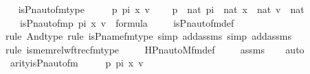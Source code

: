 \begin{isabellebody}
\ \isanewline
\isanewline
{}\isamarkupfalse%
\ is{\isacharunderscore}{\kern0pt}Pn{\isacharunderscore}{\kern0pt}auto{\isacharunderscore}{\kern0pt}fm{\isacharunderscore}{\kern0pt}type\ {\isacharcolon}{\kern0pt}\ \isanewline
\ \ \ p\ pi\ x\ v\ \isanewline
\ \ \ {\isachardoublequoteopen}p\ {\isasymin}\ nat{\isachardoublequoteclose}\ {\isachardoublequoteopen}pi\ {\isasymin}\ nat{\isachardoublequoteclose}\ {\isachardoublequoteopen}x\ {\isasymin}\ nat{\isachardoublequoteclose}\ {\isachardoublequoteopen}v\ {\isasymin}\ nat{\isachardoublequoteclose}\ \isanewline
\ \ \ {\isachardoublequoteopen}is{\isacharunderscore}{\kern0pt}Pn{\isacharunderscore}{\kern0pt}auto{\isacharunderscore}{\kern0pt}fm{\isacharparenleft}{\kern0pt}p{\isacharcomma}{\kern0pt}\ pi{\isacharcomma}{\kern0pt}\ x{\isacharcomma}{\kern0pt}\ v{\isacharparenright}{\kern0pt}\ {\isasymin}\ formula{\isachardoublequoteclose}\ \isanewline
%
\isadelimproof
\ \ %
\endisadelimproof
%
\isatagproof
{}\isamarkupfalse%
\ is{\isacharunderscore}{\kern0pt}Pn{\isacharunderscore}{\kern0pt}auto{\isacharunderscore}{\kern0pt}fm{\isacharunderscore}{\kern0pt}def\ \isanewline
\ \ \isamarkupfalse%
{\isacharparenleft}{\kern0pt}rule\ And{\isacharunderscore}{\kern0pt}type{\isacharcomma}{\kern0pt}\ rule\ is{\isacharunderscore}{\kern0pt}P{\isacharunderscore}{\kern0pt}name{\isacharunderscore}{\kern0pt}fm{\isacharunderscore}{\kern0pt}type{\isacharcomma}{\kern0pt}\ simp\ add{\isacharcolon}{\kern0pt}assms{\isacharcomma}{\kern0pt}\ simp\ add{\isacharcolon}{\kern0pt}assms{\isacharparenright}{\kern0pt}\isanewline
\ \ \isamarkupfalse%
{\isacharparenleft}{\kern0pt}rule\ is{\isacharunderscore}{\kern0pt}memrel{\isacharunderscore}{\kern0pt}wftrec{\isacharunderscore}{\kern0pt}fm{\isacharunderscore}{\kern0pt}type{\isacharparenright}{\kern0pt}\ \isanewline
\ \ \isamarkupfalse%
\ HPn{\isacharunderscore}{\kern0pt}auto{\isacharunderscore}{\kern0pt}M{\isacharunderscore}{\kern0pt}fm{\isacharprime}{\kern0pt}{\isacharunderscore}{\kern0pt}def\ \isanewline
\ \ \isamarkupfalse%
\ assms\isanewline
\ \ \isamarkupfalse%
\ auto%
\endisatagproof
{\isafoldproof}%
%
\isadelimproof
\isanewline
%
\endisadelimproof
\isanewline
{}\isamarkupfalse%
\ arity{\isacharunderscore}{\kern0pt}is{\isacharunderscore}{\kern0pt}Pn{\isacharunderscore}{\kern0pt}auto{\isacharunderscore}{\kern0pt}fm\ {\isacharcolon}{\kern0pt}\ \isanewline
\ \ \ p\ pi\ x\ v\ \isanewline

\end{isabellebody}
